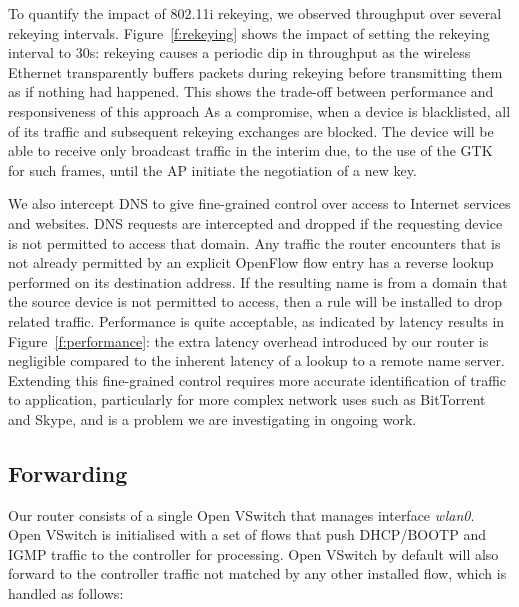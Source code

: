 To quantify the impact of 802.11i rekeying, we observed throughput
over several rekeying intervals.  Figure~\ref{f:rekeying} shows the
impact of setting the rekeying interval to 30s: rekeying causes a
periodic dip in throughput as the wireless Ethernet transparently
buffers packets during rekeying before transmitting them as if nothing
had happened.  This shows the trade-off between performance and
responsiveness of this approach
As a compromise, when a device is blacklisted, all of its traffic and
subsequent rekeying exchanges are blocked.
The device will be able to receive only
broadcast traffic in the interim due, to the use of the GTK for such
frames, until the AP initiate the negotiation of a new key.  

We also intercept DNS to give fine-grained control over access to
Internet services and websites.  DNS requests are intercepted and
dropped if the requesting device is not permitted to access that
domain.  Any traffic the router encounters that is not already
permitted by an explicit OpenFlow flow entry has a reverse lookup
performed on its destination address.  If the resulting name is from a
domain that the source device is not permitted to access, then a rule
will be installed to drop related traffic.  Performance is quite
acceptable, as indicated by latency results in
Figure~\ref{f:performance}: the extra latency overhead introduced by
our router is negligible compared to the inherent latency of a lookup
to a remote name server.  Extending this fine-grained control requires
more accurate identification of traffic to application, particularly
for more complex network uses such as BitTorrent and Skype, and is a
problem we are investigating in ongoing work.

\subsection{Forwarding}
\label{s:forwarding}
 
Our router consists of a single Open VSwitch that manages interface
\emph{wlan0}.  Open VSwitch is initialised with a set of flows that push
DHCP/BOOTP and IGMP traffic to the controller for processing.
Open VSwitch by default will also forward to the controller traffic not
matched by any other installed flow, which is handled as follows:

